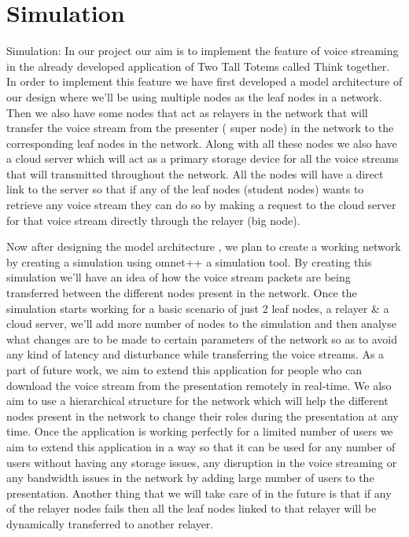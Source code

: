 \section{Simulation}

Simulation:
In our project our aim is to implement the feature of voice streaming in the already developed application of Two Tall Totems called Think together. In order to implement this feature we have first developed a model architecture of our design where we’ll be using multiple nodes as the leaf nodes in a network. Then we also have some nodes that act as relayers in the network that will transfer the voice stream from the presenter ( super node) in the network to the corresponding leaf nodes in the network. Along with all these nodes we also have a cloud server which will act as a primary storage device for all the voice streams that will transmitted throughout the network. All the nodes will have a direct link to the server so that if any of the leaf nodes (student nodes) wants to retrieve any voice stream they can do so by making a request to the cloud server for that voice stream directly through the relayer (big node). 





Now after designing the model architecture , we plan to create a working network by creating a simulation using omnet++ a simulation tool. By creating this simulation we’ll have an idea of how the voice stream packets are being transferred between the different nodes present in the network. Once the simulation starts working for a basic scenario of just 2 leaf nodes, a relayer \& a cloud server, we’ll add more number of nodes to the simulation and then analyse what changes are to be made to certain parameters of the network so as to avoid any kind of latency and disturbance while transferring the voice streams. 
As a part of future work, we aim to extend this application for people who can download the voice stream from the presentation remotely in real-time. We also aim to use a hierarchical structure for the network which will help the different nodes present in the network to change their roles during the presentation at any time. Once the application is working perfectly for a limited number of users we aim to extend this application in a way so that it can be used for any number of users without having any storage issues, any disruption in the voice streaming or any bandwidth issues in the network by adding large number of users to the presentation. Another thing that we will take care of in the future is that if any of the relayer nodes fails then all the leaf nodes linked to that relayer will be dynamically transferred to another relayer.


